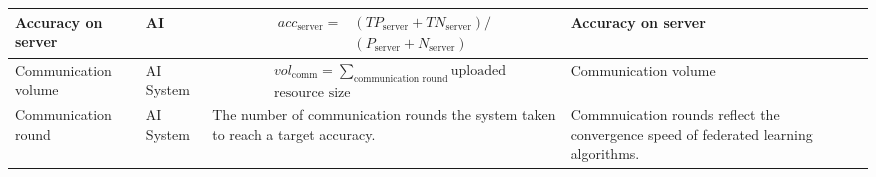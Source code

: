 \begin{table}[h]
\begin{tabular}{|p{3cm}|l|p{6cm}|p{3cm}|p{1.5cm}|}
Accuracy on server
& AI
&
\parbox{3cm}{
    \begin{equation} \label{equ:aos} 
    \begin{split}
acc_{\text{server}} = 
& (TP_{\text{server}} + TN_{\text{server}}) / \\
& (P_{\text{server}} + N_{\text{server}} )
    \end{split}
    \end{equation}
}
& 
Accuracy on server
& \cite{DBLP:conf/aistats/McMahanMRHA17}
\\ \hline

Communication volume
& AI System
&
\parbox{3cm}{
    \begin{equation} \label{equ:cv}  
    \begin{split}
& vol_{\text{comm}} = 
 \sum_{\text{communication round}} 
\text{uploaded} \\
& \text{resource size}
    \end{split}
    \end{equation}
}
& 
Communication volume
& \cite{DBLP:conf/aistats/McMahanMRHA17}
\\ \hline

Communication round
& AI System
&
The number of communication rounds the system taken to reach a target accuracy. 
& 
Commnuication rounds reflect the convergence speed of federated learning algorithms.
& \cite{DBLP:conf/aistats/McMahanMRHA17}
\\ \hline

\end{tabular}
\end{table}

